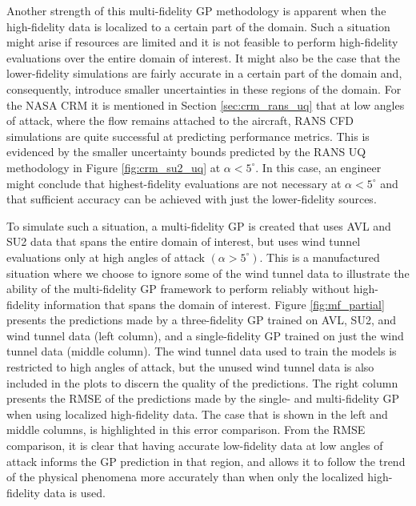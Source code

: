 Another strength of this multi-fidelity GP methodology is apparent when the high-fidelity data is localized to a certain part of the domain.
Such a situation might arise if resources are limited and it is not feasible to perform high-fidelity evaluations over the entire domain of interest.
It might also be the case that the lower-fidelity simulations are fairly accurate in a certain part of the domain and, consequently, introduce smaller uncertainties in these regions of the domain.
For the NASA CRM it is mentioned in Section \ref{sec:crm_rans_uq} that at low angles of attack, where the flow remains attached to the aircraft, RANS CFD simulations are quite successful at predicting performance metrics.
This is evidenced by the smaller uncertainty bounds predicted by the RANS UQ methodology in Figure \ref{fig:crm_su2_uq} at $\alpha < 5^\circ$.
In this case, an engineer might conclude that highest-fidelity evaluations are not necessary at $\alpha < 5^\circ$ and that sufficient accuracy can be achieved with just the lower-fidelity sources. 

To simulate such a situation, a multi-fidelity GP is created that uses AVL and SU2 data that spans the entire domain of interest, but uses wind tunnel evaluations only at high angles of attack $(\alpha > 5^\circ)$.
This is a manufactured situation where we choose to ignore some of the wind tunnel data to illustrate the ability of the multi-fidelity GP framework to perform reliably without high-fidelity information that spans the domain of interest.
Figure \ref{fig:mf_partial} presents the predictions made by a three-fidelity GP trained on AVL, SU2, and wind tunnel data (left column), and a single-fidelity GP trained on just the wind tunnel data (middle column).
The wind tunnel data used to train the models is restricted to high angles of attack, but the unused wind tunnel data is also included in the plots to discern the quality of the predictions.
The right column presents the RMSE of the predictions made by the single- and multi-fidelity GP when using localized high-fidelity data.
The case that is shown in the left and middle columns, is highlighted in this error comparison.
From the RMSE comparison, it is clear that having accurate low-fidelity data at low angles of attack informs the GP prediction in that region, and allows it to follow the trend of the physical phenomena more accurately than when only the localized high-fidelity data is used. 

